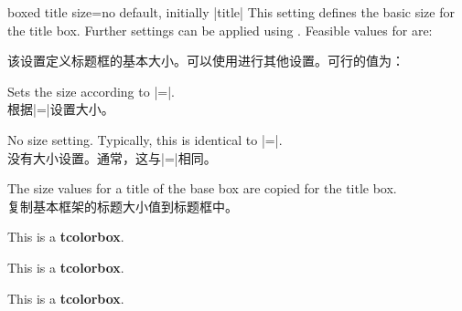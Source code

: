 \begin{docTcbKey}[][doc new=2016-02-26]{boxed title size}{=}{no default, initially |title|}
This setting defines the basic size for the title box. Further settings
can be applied using .
Feasible values for  are:

该设置定义标题框的基本大小。可以使用进行其他设置。可行的值为： 
  
\begin{DescriptionL}{}
\item[\docValue{title}] Sets the size according to |=|.
\\根据|=|设置大小。
\item[\docValue{standard}] No size setting. Typically, this is identical to
|=|.
\\没有大小设置。通常，这与|=|相同。
\item[\docValue{copy}] The size values for a title of the base box are copied
for the title box.
\\复制基本框架的标题大小值到标题框中。
\end{DescriptionL}

\begin{dispExample}
\begin{tcbraster}[raster columns=3,enhanced,boxrule=0.4pt,
title=My title,attach boxed title to top center]
\begin{tcolorbox}[boxed title size=title]
This is a \textbf{tcolorbox}.
\end{tcolorbox}
\begin{tcolorbox}[boxed title size=standard]
This is a \textbf{tcolorbox}.
\end{tcolorbox}
\begin{tcolorbox}[boxed title size=copy]
This is a \textbf{tcolorbox}.
\end{tcolorbox}
\end{tcbraster}
\end{dispExample}

\end{docTcbKey}


